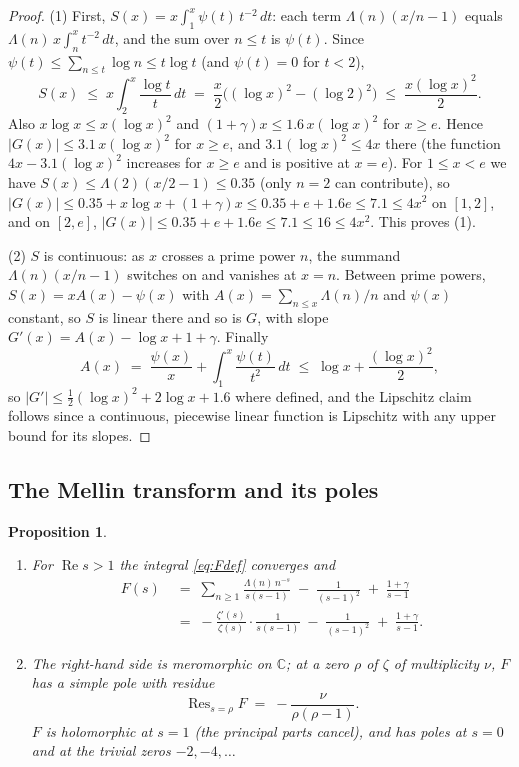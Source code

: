 \documentclass[11pt]{amsart}
\newtheorem{proposition}[theorem]{Proposition}
\numberwithin{equation}{section}
\newcommand{\C}{\mathbb{C}}
\newcommand{\res}{\operatorname{Res}}
\newcommand{\re}{\operatorname{Re}}
\newcommand{\Lam}{\Lambda}
\newcommand{\Euler}{\gamma}
\begin{document}
\begin{proof}
(1) First, $S(x) = x\int_1^x \psi(t)\,t^{-2}\,dt$: each term
$\Lam(n)(x/n - 1)$ equals $\Lam(n)\,x\int_n^x t^{-2}\,dt$, and the sum
over $n \le t$ is $\psi(t)$. Since $\psi(t) \le \sum_{n \le t}\log n \le
t\log t$ (and $\psi(t) = 0$ for $t < 2$),
\[
S(x) \;\le\; x \int_2^x \frac{\log t}{t}\,dt
\;=\; \frac{x}{2}\bigl((\log x)^2 - (\log 2)^2\bigr) \;\le\;
\frac{x(\log x)^2}{2}.
\]
Also $x\log x \le x(\log x)^2$ and $(1+\Euler)x \le 1.6\,x(\log x)^2$
for $x \ge e$. Hence $|G(x)| \le 3.1\,x(\log x)^2$ for $x \ge e$, and
$3.1(\log x)^2 \le 4x$ there (the function $4x - 3.1(\log x)^2$
increases for $x \ge e$ and is positive at $x=e$). For $1 \le x < e$ we
have $S(x) \le \Lam(2)(x/2 - 1) \le 0.35$ (only $n=2$ can contribute),
so $|G(x)| \le 0.35 + x\log x + (1+\Euler)x \le 0.35 + e + 1.6e \le
7.1 \le 4x^2$ on $[1, 2]$, and on $[2,e]$, $|G(x)| \le 0.35 + e + 1.6e
\le 7.1 \le 16 \le 4x^2$. This proves (1).

(2) $S$ is continuous: as $x$ crosses a prime power $n$, the summand
$\Lam(n)(x/n-1)$ switches on and vanishes at $x = n$. Between prime
powers, $S(x) = x A(x) - \psi(x)$ with $A(x) = \sum_{n\le x}\Lam(n)/n$
and $\psi(x)$ constant, so $S$ is linear there and so is $G$, with slope
$G'(x) = A(x) - \log x + 1 + \Euler$. Finally
\[
A(x) \;=\; \frac{\psi(x)}{x} + \int_1^x \frac{\psi(t)}{t^2}\,dt
\;\le\; \log x + \frac{(\log x)^2}{2},
\]
so $|G'| \le \tfrac12(\log x)^2 + 2\log x + 1.6$ where defined, and the
Lipschitz claim follows since a continuous, piecewise linear function is
Lipschitz with any upper bound for its slopes.
\end{proof}

\subsection{The Mellin transform and its poles}

\begin{proposition}\label{prop:mellin}\
\begin{enumerate}
\item For $\re s > 1$ the integral \eqref{eq:Fdef} converges and
\[
\begin{split}
F(s) \;&=\; \sum_{n\ge1} \frac{\Lam(n)\,n^{-s}}{s(s-1)}
\;-\; \frac{1}{(s-1)^2} \;+\; \frac{1+\Euler}{s-1}\\
     \;&=\; -\frac{\zeta'(s)}{\zeta(s)}\cdot\frac{1}{s(s-1)}
\;-\; \frac{1}{(s-1)^2} \;+\; \frac{1+\Euler}{s-1}.
\end{split}
\]
\item The right-hand side is meromorphic on $\C$; at a zero $\rho$ of
$\zeta$ of multiplicity $\nu$, $F$ has a simple pole with residue
\[
\res_{s=\rho} F \;=\; -\frac{\nu}{\rho(\rho-1)}.
\]
$F$ is holomorphic at $s = 1$ (the principal parts cancel), and has poles
at $s=0$ and at the trivial zeros $-2, -4, \ldots$
\end{enumerate}
\end{proposition}
\end{document}
